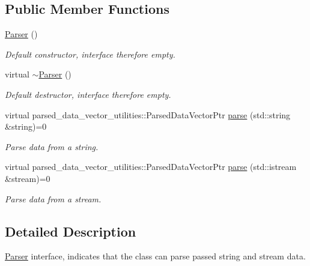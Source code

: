 \subsection*{Public Member Functions}
\begin{DoxyCompactItemize}
\item 
\hyperlink{classtudat_1_1input__output_1_1Parser_a92b1c3e6592eee050c09d28504225aa1}{Parser} ()\hypertarget{classtudat_1_1input__output_1_1Parser_a92b1c3e6592eee050c09d28504225aa1}{}\label{classtudat_1_1input__output_1_1Parser_a92b1c3e6592eee050c09d28504225aa1}

\begin{DoxyCompactList}\small\item\em Default constructor, interface therefore empty. \end{DoxyCompactList}\item 
virtual \hyperlink{classtudat_1_1input__output_1_1Parser_a2f1426cf83f5b023aaf5ecb34d16350f}{$\sim$\+Parser} ()\hypertarget{classtudat_1_1input__output_1_1Parser_a2f1426cf83f5b023aaf5ecb34d16350f}{}\label{classtudat_1_1input__output_1_1Parser_a2f1426cf83f5b023aaf5ecb34d16350f}

\begin{DoxyCompactList}\small\item\em Default destructor, interface therefore empty. \end{DoxyCompactList}\item 
virtual parsed\+\_\+data\+\_\+vector\+\_\+utilities\+::\+Parsed\+Data\+Vector\+Ptr \hyperlink{classtudat_1_1input__output_1_1Parser_a136ddd9ae7adf905c38bd60ef4138593}{parse} (std\+::string \&string)=0
\begin{DoxyCompactList}\small\item\em Parse data from a string. \end{DoxyCompactList}\item 
virtual parsed\+\_\+data\+\_\+vector\+\_\+utilities\+::\+Parsed\+Data\+Vector\+Ptr \hyperlink{classtudat_1_1input__output_1_1Parser_a896eecdb14f86e361dc9d0bdeccdc915}{parse} (std\+::istream \&stream)=0
\begin{DoxyCompactList}\small\item\em Parse data from a stream. \end{DoxyCompactList}\end{DoxyCompactItemize}


\subsection{Detailed Description}
\hyperlink{classtudat_1_1input__output_1_1Parser}{Parser} interface, indicates that the class can parse passed string and stream data. 

